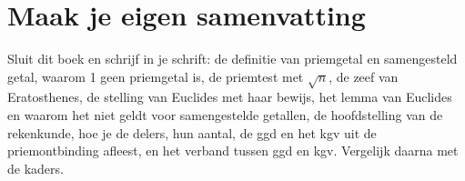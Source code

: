 
\ifzelfstudie
\section*{Maak je eigen samenvatting}
Sluit dit boek en schrijf in je schrift: de definitie van priemgetal en samengesteld getal, waarom 1 geen priemgetal is, de priemtest met $\sqrt n$, de zeef van Eratosthenes, de stelling van Euclides met haar bewijs, het lemma van Euclides en waarom het niet geldt voor samengestelde getallen, de hoofdstelling van de rekenkunde, hoe je de delers, hun aantal, de ggd en het kgv uit de priemontbinding afleest, en het verband tussen ggd en kgv. Vergelijk daarna met de kaders.
\fi
